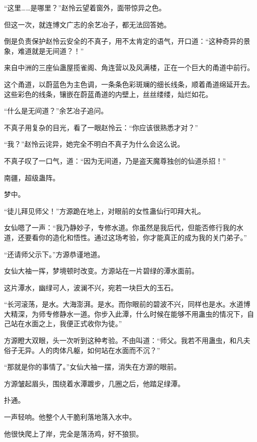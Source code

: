 
\begin{this_body}

“这里……是哪里？”赵怜云望着窗外，面带惊异之色。

但这一次，就连博文广志的余艺冶子，都无法回答她。

倒是负责保护赵怜云安全的不真子，用不太肯定的语气，开口道：“这种奇异的景象，难道就是无间道？！”

来自中洲的三座仙蛊屋揽雀阁、角连营以及风满楼，正在一个巨大的甬道中前行。

这个甬道，以蔚蓝色为主色调，一条条色彩斑斓的细长线条，顺着甬道绵延开去。这些彩色的线条，镶嵌在蔚蓝甬道的内壁上，丝丝缕缕，灿烂如花。

“什么是无间道？”余艺冶子追问。

不真子用复杂的目光，看了一眼赵怜云：“你应该很熟悉才对？”

“我？”赵怜云诧异，她完全不明白不真子为什么会这么说。

不真子叹了一口气，道：“因为无间道，乃是盗天魔尊独创的仙道杀招！”

南疆，超级蛊阵。

梦中。

“徒儿拜见师父！”方源跪在地上，对眼前的女性蛊仙行叩拜大礼。

女仙嗯了一声：“我乃静妙子，专修水道。你虽然是我后代，但能否修行我的水道，还要看你的造化和悟性。通过这场考验，你才能真正的成为我的关门弟子。”

“还请师父示下。”方源恭谨地道。

女仙大袖一挥，梦境顿时改变。方源站在一片碧绿的潭水面前。

这片潭水，幽绿可人，波澜不兴，宛若一块巨大的玉石。

“长河滚荡，是水。大海澎湃。是水。而你眼前的碧波不兴，同样也是水。水道博大精深，为师专修静水一道。你步入此潭，什么时候在能够不用蛊虫的情况下，自己站在水面之上，我便正式收你为徒。”

方源瞪大双眼，头一次听到这种考验。不由叫道：“师父。我若不用蛊虫，和凡夫俗子无异。人的肉体凡躯，如何站在水面而不沉？”

“那就是你的事情了。”女仙大袖一摆，消失在方源的眼前。

方源皱起眉头，围绕着水潭踱步，几圈之后，他踏足绿潭。

扑通。

一声轻响。他整个人干脆利落地落入水中。

他很快爬上了岸，完全是落汤鸡，好不狼狈。


\end{this_body}
